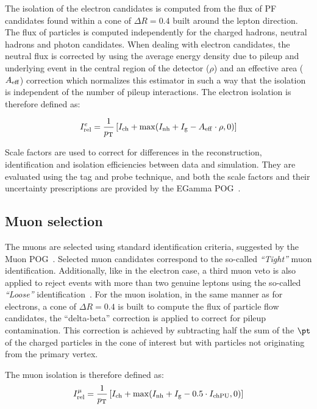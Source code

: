 The isolation of the electron candidates is computed from the flux of PF candidates found within a cone of $\Delta R = 0.4$ built around the lepton direction.
The flux of particles is computed independently for the charged hadrons, neutral hadrons and photon candidates. When dealing with electron candidates, the neutral flux is corrected by using the average energy density due to
pileup and underlying event in the central region of the detector ($\rho$)
and an effective area ($A_{\rm eff}$) correction which normalizes this
estimator in such a way that the isolation is independent of the number of pileup interactions. The electron isolation is therefore defined as:

\begin{equation}
I^{e}_{\rm rel}=\frac{1}{p_{\rm T}}  \left[ I_{\rm ch}+\max(I_{\rm nh}+I_{\rm g}-A_{\rm eff}\cdot\rho,0) \right]
\label{eq:eleisol}
\end{equation}

Scale factors are used to correct for differences in the reconstruction, 
identification and isolation efficiencies between data and simulation. They 
are evaluated using the tag and probe technique, and both the scale factors and 
their uncertainty prescriptions are provided by the EGamma POG~\cite{Twiki:EGammaSF2016}.
 

\subsection{Muon selection}
The muons are selected using standard identification criteria, suggested by the Muon POG~\cite{Twiki:MuonRun2}. Selected muon candidates correspond to the so-called {\em``Tight''} muon identification. Additionally, like in the electron case, a third muon veto is also applied to reject events with more than two genuine leptons using the so-called {\em``Loose''} identification~\cite{Twiki:MuonRun2}. 
For the muon isolation, in the same manner as for electrons, a cone of $\Delta R = 0.4$ is built to compute the flux of particle flow candidates,
the ``delta-beta'' correction is applied to correct for pileup contamination. This correction is achieved by subtracting half the sum of the $\pt$ of the charged particles in the cone of interest but with particles not originating from the primary vertex.

The muon isolation is therefore defined as:
\begin{equation}
I^{\mu}_{\rm rel}=\frac{1}{p_{\rm T}}  \left[ I_{\rm ch}+\max(I_{\rm nh}+I_{\rm g}-0.5\cdot I_{\rm chPU} ,0) \right]
\label{eq:muisol}
\end{equation}
 
